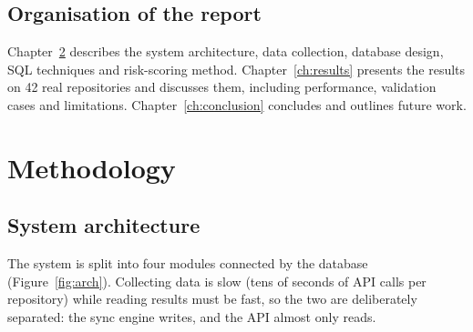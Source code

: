 \documentclass[11pt,a4paper]{report}
\begin{document}
\section{Organisation of the report}

Chapter~\ref{ch:method} describes the system architecture, data collection,
database design, SQL techniques and risk-scoring method.
Chapter~\ref{ch:results} presents the results on 42 real repositories and
discusses them, including performance, validation cases and limitations.
Chapter~\ref{ch:conclusion} concludes and outlines future work.

\chapter{Methodology}
\label{ch:method}

\section{System architecture}

The system is split into four modules connected by the database
(Figure~\ref{fig:arch}). Collecting data is slow (tens of seconds of API calls
per repository) while reading results must be fast, so the two are deliberately
separated: the sync engine writes, and the API almost only reads.
\end{document}
